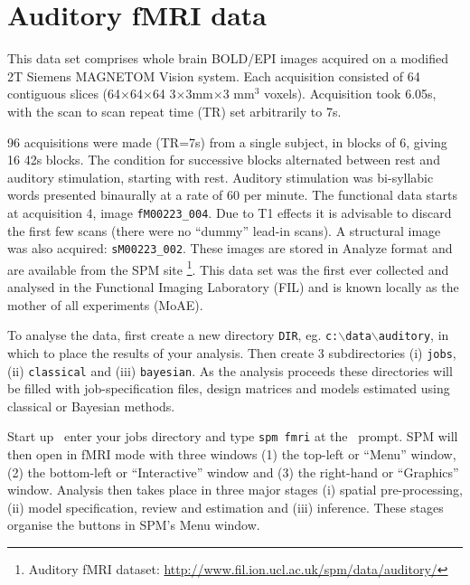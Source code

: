 \chapter{Auditory fMRI data \label{Chap:data:auditory}}
 
This data set comprises whole brain BOLD/EPI images acquired on a modified 2T Siemens MAGNETOM Vision system. Each acquisition consisted of 64 contiguous slices (64$\times$64$\times$64 3$\times$3mm$\times$3 mm$^3$ voxels). Acquisition took 6.05s, with the scan to scan repeat time (TR) set arbitrarily to 7s.

96 acquisitions were made (TR=7s) from a single subject, in blocks of 6, giving 16 42s blocks. The condition for successive blocks alternated between rest and auditory stimulation, starting with rest. Auditory stimulation was bi-syllabic words presented binaurally at a rate of 60 per minute. The functional data starts at acquisition 4, image \texttt{fM00223\_004}. Due to T1 effects it is advisable to discard the first few scans (there were no ``dummy'' lead-in scans). A structural image was also acquired: \texttt{sM00223\_002}. These images are stored in Analyze format and are available from the SPM site \footnote{Auditory fMRI dataset: \url{http://www.fil.ion.ucl.ac.uk/spm/data/auditory/}}. This data set was the first ever collected and analysed in the Functional Imaging Laboratory (FIL) and is known locally as the mother of all experiments (MoAE).

To analyse the data, first create a new directory \texttt{DIR},  eg. \texttt{c:$\backslash$data$\backslash$auditory}, in which to place the results of your analysis. Then create 3 subdirectories (i) \texttt{jobs}, (ii) \texttt{classical} and (iii) \texttt{bayesian}. As the analysis proceeds these directories will be filled with job-specification files, design matrices and models estimated using classical or Bayesian methods.

Start up \matlab\, enter your jobs directory and type \texttt{spm fmri} at the \matlab\ prompt. SPM will then open in fMRI mode with three windows (1) the top-left or ``Menu'' window, (2) the bottom-left or ``Interactive'' window and (3) the right-hand or ``Graphics'' window. Analysis then takes place in three major stages (i) spatial pre-processing, (ii) model specification, review and estimation and (iii) inference. These stages organise the buttons in SPM's Menu window.

